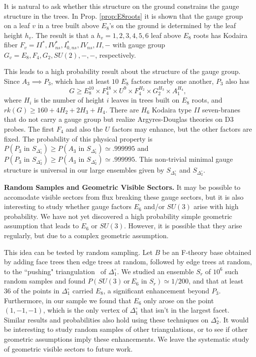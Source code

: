 \documentclass[aps,prl,twocolumn, superscriptaddress,groupedaddress,nofootinbib]{revtex4-1}
\newcommand{\sdoc}{S_{\Delta_1^\circ}}
\newcommand{\sdtc}{S_{\Delta_2^\circ}}
\newcommand{\doc}{{\Delta_1^\circ}}
\newcommand{\dtc}{{\Delta_2^\circ}}
\newcommand{\textin}{\,\, \text{in} \,\,}
\newcommand{\XXX}[3]{}
\begin{document}
It is natural to ask whether this structure on the ground constrains the gauge
structure in the trees. In Prop. \ref{prop:E8roots} it is shown that the 
 gauge group on a leaf $v$ in a tree built above $E_8$'s on the ground
is determined by the leaf height $h_v$. 
The result is that a $h_v=1,2,3,4,5,6$ leaf
above $E_8$ roots has Kodaira fiber $F_v=II^*,IV^*_{ns},I^*_{0,ns},IV_{ns},II,-$
with gauge group $G_v=E_8,F_4,G_2,SU(2),-,-$, respectively.

This leads to a high probability result about the structure of the  gauge group.
Since $A_3\implies P_3$, which has at least $10$ $E_8$ factors nearby one another, $P_3$
also has
\begin{equation}
G\geq E_8^{10} \times F_4^{18}\times U^9 \times F_4^{H_2}\times G_2^{H_3}\times A_1^{H_4},
\end{equation}
where $H_i$ is the number of height $i$ leaves in trees built on $E_8$ roots,
and $rk(G)\geq 160+4H_2+2H_3+H_4$.
There are $H_6$ Kodaira type $II$ seven-branes that do not carry a gauge group but realize
Argyres-Douglas theories on D3 probes. The first $F_4$ and also
the $U$ factors may enhance, but the other factors are fixed. The probability
of this physical property is $P(P_3\textin \sdoc)\geq P(A_3\textin \sdoc) \simeq .999995$ and $P(P_3\textin \sdtc)\geq P(A_3\textin \sdtc) \simeq .999995$. This non-trivial minimal gauge structure is universal in our large ensembles given by $\sdoc$ and $\sdtc$.



\vspace{.2cm}
\noindent \textbf{Random Samples and Geometric Visible Sectors.} 
It may be possible to accomodate visible sectors from flux breaking
these gauge sectors, but it is also interesting to study whether gauge
factors $E_6$ and/or $SU(3)$ arise with high probability.
We have not yet discovered a high probability simple geometric assumption
that leads to $E_6$ or $SU(3)$. However, it is possible that they arise regularly,
but due to a complex geometric assumption.

This idea can be tested by random sampling. Let $B$ be an F-theory base obtained
by adding face trees then edge trees at random, followed by edge trees at random, to the ``pushing" 
triangulation~\cite{DeLoera:2010:TSA:1952022} of $\doc$. We studied an ensemble $S_r$ of $10^6$ such random samples 
and found $P(SU(3) \, \text{or} \, E_6 \textin S_r)\simeq 1/200$, and that at least 
$36$ of the points in $\doc$ carried $E_8$, a significant enhancement beyond
$P_3$.  Furthermore, in our sample we found that $E_6$ only
arose on the point $(1,-1,-1)$, which is the only vertex of $\doc$
that isn't in the largest facet.  Similar results and probabilities also hold
using these techniques on $\dtc$. It would be interesting to study random samples of other triangulations, or to
see if other geometric assumptions imply these enhancements. We 
leave the systematic study of geometric visible sectors to future work.
\end{document}
